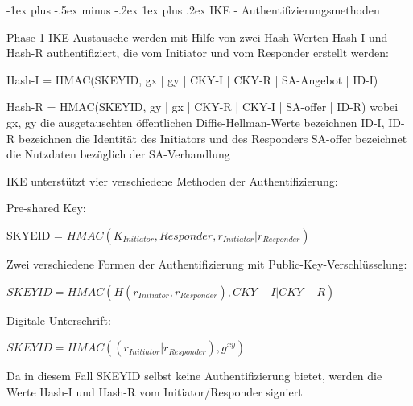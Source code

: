 \documentclass[a4paper]{article}
\makeatletter
\renewcommand{\subsubsection}{\@startsection{subsubsection}{3}{0mm}%
 {-1ex plus -.5ex minus -.2ex}%
 {1ex plus .2ex}%
 {\normalfont\small\bfseries}}
\makeatother
\begin{document}
\begin{multicols}{3}
\begin{itemize*}
            \subsubsection{IKE -
                  Authentifizierungsmethoden}
            \begin{itemize*}
                  \item Phase 1 IKE-Austausche werden mit Hilfe von zwei Hash-Werten Hash-I
                  und Hash-R authentifiziert, die vom Initiator und vom Responder
                  erstellt werden:
                  \begin{itemize*}
                        \item Hash-I = HMAC(SKEYID, gx | gy | CKY-I | CKY-R | SA-Angebot | ID-I)
                        \item Hash-R = HMAC(SKEYID, gy | gx | CKY-R | CKY-I | SA-offer | ID-R) wobei gx, gy die ausgetauschten öffentlichen Diffie-Hellman-Werte bezeichnen ID-I, ID-R bezeichnen die Identität des Initiators und des Responders SA-offer bezeichnet die Nutzdaten bezüglich der SA-Verhandlung
                  \end{itemize*}
                  \item IKE unterstützt vier verschiedene Methoden der Authentifizierung:
                  \begin{itemize*}
                        \item Pre-shared Key:
                        \begin{itemize*}
                              \item SKYEID = $HMAC(K_{Initiator}, Responder , r_{Initiator} | r_{Responder})$
                        \end{itemize*}
                        \item Zwei verschiedene Formen der Authentifizierung mit Public-Key-Verschlüsselung:
                        \begin{itemize*}
                              \item $SKEYID = HMAC(H(r_{Initiator}, r_{Responder}), CKY-I | CKY-R)$
                        \end{itemize*}
                        \item Digitale Unterschrift:
                        \begin{itemize*}
                              \item $SKEYID = HMAC((r_{Initiator} | r_{Responder}), g^{xy})$
                              \item Da in diesem Fall SKEYID selbst keine Authentifizierung bietet, werden die Werte Hash-I und Hash-R vom Initiator/Responder signiert
                        \end{itemize*}
                  \end{itemize*}
            \end{itemize*}


\end{itemize*}
\end{multicols}
\end{document}
